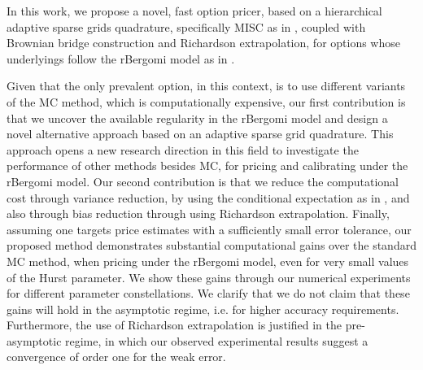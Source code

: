 In this work,  we propose a novel, fast option pricer,  based on a  hierarchical adaptive sparse grids quadrature, specifically  MISC as in  \cite{haji2016multi}, coupled with Brownian bridge construction and Richardson extrapolation, for options whose underlyings  follow the rBergomi model as in \cite{bayer2016pricing}. 



Given that the only prevalent option, in this context, is to use different variants of the MC method, which is computationally expensive, our first contribution  is that we uncover the available regularity in the rBergomi model and  design a novel alternative approach based on an  adaptive sparse grid quadrature. This approach  opens a new research direction in this field to investigate the performance of other methods besides MC, for pricing and calibrating under the rBergomi model. Our second contribution is that we reduce the computational cost through variance reduction,  by using the conditional expectation as in \cite{mccrickerd2018turbocharging}, and also through bias reduction through using Richardson extrapolation. Finally, assuming one targets price estimates with a sufficiently small error tolerance, our proposed method demonstrates substantial computational gains  over the standard MC method, when pricing under the rBergomi model, even for very small values of the Hurst parameter. We show  these gains through our numerical experiments for  different parameter constellations.  We clarify that we do not claim that these gains will hold in the asymptotic regime, i.e.  for higher accuracy requirements. Furthermore, the use of Richardson extrapolation is justified in the pre-asymptotic regime, in which our observed experimental results suggest a convergence of order one for the weak error.



